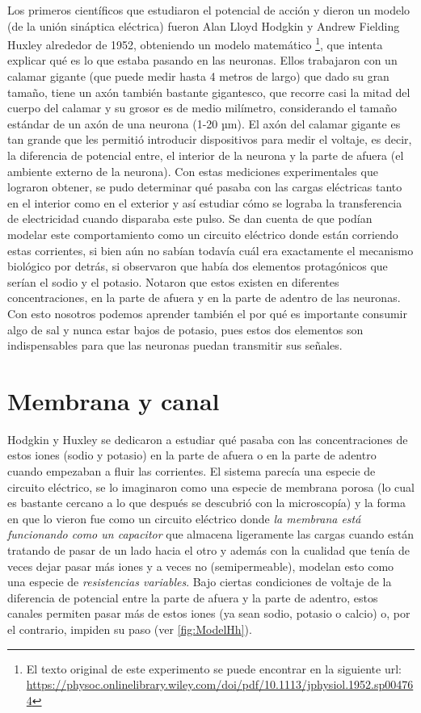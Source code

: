 Los primeros científicos que estudiaron el potencial de acción y dieron un modelo (de la unión sináptica eléctrica) fueron Alan Lloyd Hodgkin y Andrew Fielding Huxley alrededor de 1952, obteniendo un modelo matemático \footnote{El texto original de este experimento se puede encontrar en la siguiente url: \url{ https://physoc.onlinelibrary.wiley.com/doi/pdf/10.1113/jphysiol.1952.sp004764}}, que intenta explicar qué es lo que estaba pasando en las neuronas. Ellos trabajaron con un calamar gigante (que puede medir hasta 4 metros de largo) que dado su gran tamaño, tiene un axón también bastante gigantesco, que recorre casi la mitad del cuerpo del calamar y su grosor es de medio milímetro, considerando el tamaño estándar de un axón de una neurona (1-20 µm). El axón del calamar gigante es tan grande que les permitió introducir dispositivos para medir el voltaje, es decir, la diferencia de potencial entre, el interior de la neurona y la parte de afuera (el ambiente externo de la neurona). Con estas mediciones experimentales que lograron obtener, se pudo determinar qué pasaba con las cargas eléctricas tanto en el interior como en el exterior y así estudiar cómo se lograba la transferencia de electricidad cuando disparaba este pulso. 
 Se dan cuenta de que podían modelar este comportamiento como un circuito eléctrico donde están corriendo estas corrientes, si bien aún no sabían todavía cuál era exactamente el mecanismo biológico por detrás, si observaron que había dos elementos protagónicos que serían el sodio y el potasio.
 Notaron que estos existen en diferentes concentraciones, en la parte de afuera y en la parte de adentro de las neuronas. Con esto nosotros podemos aprender también el por qué es importante consumir algo de sal y nunca estar bajos de potasio, pues estos dos elementos son indispensables para que las neuronas puedan transmitir sus señales. 

\section{Membrana y canal}

Hodgkin y Huxley se dedicaron a estudiar qué pasaba con las concentraciones de estos iones (sodio y potasio) en la parte de afuera o en la parte de adentro cuando empezaban a fluir las corrientes. El sistema parecía una especie de circuito eléctrico, se lo imaginaron como una especie de membrana porosa (lo cual es bastante cercano a lo que después se descubrió con la microscopía) y la forma en que lo vieron fue como un circuito eléctrico donde \textit{la membrana está funcionando como un capacitor} que almacena ligeramente las cargas cuando están tratando de pasar de un lado hacia el otro y además con la cualidad que tenía de veces dejar pasar más iones y a veces no (semipermeable), modelan esto como una especie de \textit{resistencias variables}. Bajo ciertas condiciones de voltaje de la diferencia de potencial entre la parte de afuera y la parte de adentro, estos canales permiten pasar más de estos iones (ya sean sodio, potasio o calcio) o, por el contrario, impiden su paso (ver \ref{fig:ModelHh}).


